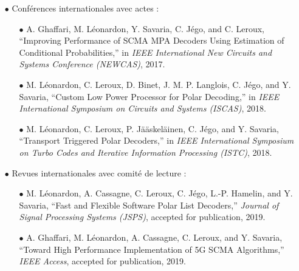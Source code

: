 \begin{itemize}
	\item[$\bullet$] Conférences internationales avec actes :
	\begin{itemize}
		\item[$\bullet$] A. Ghaffari, M. Léonardon, Y. Savaria, C. Jégo, and C. Leroux, “Improving Performance of SCMA MPA Decoders Using Estimation of Conditional Probabilities,” in \textit{IEEE International New Circuits and Systems Conference (NEWCAS)}, 2017.
		\item[$\bullet$] M. Léonardon, C. Leroux, D. Binet, J. M. P. Langlois, C. Jégo, and Y. Savaria, “Custom Low Power Processor for Polar Decoding,” in \textit{IEEE International Symposium on Circuits and Systems (ISCAS)}, 2018.
		\item[$\bullet$] M. Léonardon, C. Leroux, P. Jääskeläinen, C. Jégo, and Y. Savaria, “Transport Triggered Polar Decoders,” in \textit{IEEE International Symposium on Turbo Codes and Iterative Information Processing (ISTC)}, 2018.
	\end{itemize}
	\item[$\bullet$] Revues internationales avec comité de lecture :
	\begin{itemize}
		\item[$\bullet$] M. Léonardon, A. Cassagne, C. Leroux, C. Jégo, L.-P. Hamelin, and Y. Savaria, “Fast and Flexible Software Polar List Decoders,” \textit{Journal of Signal Processing Systems (JSPS)}, accepted for publication, 2019.
        \item[$\bullet$] A. Ghaffari, M. Léonardon, A. Cassagne, C. Leroux, and Y. Savaria, “Toward High Performance Implementation of 5G SCMA Algorithms,” \textit{IEEE Access}, accepted for publication, 2019.
	\end{itemize}
\end{itemize}


